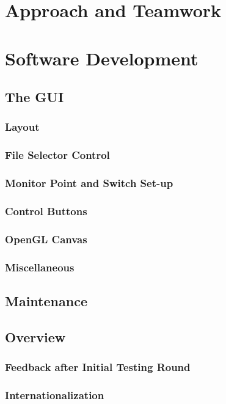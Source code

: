 \documentclass{article}					%
\begin{document}
\section{Approach and Teamwork}

\section{Software Development}
\subsection{The GUI}
\subsubsection{Layout}
\subsubsection{File Selector Control}
\subsubsection{Monitor Point and Switch Set-up}
\subsubsection{Control Buttons}
\subsubsection{OpenGL Canvas}
\subsubsection{Miscellaneous}

\subsection{Maintenance}
\subsection{Overview}
\subsubsection{Feedback after Initial Testing Round}
\subsubsection{Internationalization}
\end{document}
